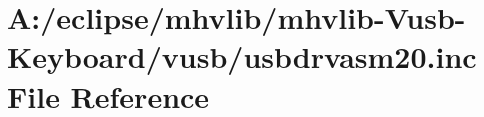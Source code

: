 \hypertarget{mhvlib-_vusb-_keyboard_2vusb_2usbdrvasm20_8inc}{\section{A\-:/eclipse/mhvlib/mhvlib-\/\-Vusb-\/\-Keyboard/vusb/usbdrvasm20.inc File Reference}
\label{mhvlib-_vusb-_keyboard_2vusb_2usbdrvasm20_8inc}
}
